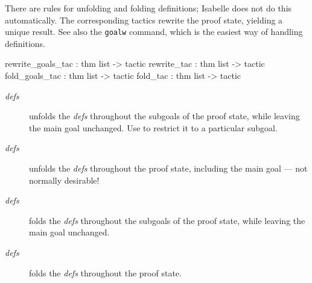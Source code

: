 There are rules for unfolding and folding definitions; Isabelle does not do
this automatically.  The corresponding tactics rewrite the proof state,
yielding a unique result.  See also the {\tt goalw} command, which is the
easiest way of handling definitions.
\begin{ttbox} 
rewrite_goals_tac : thm list -> tactic
rewrite_tac       : thm list -> tactic
fold_goals_tac    : thm list -> tactic
fold_tac          : thm list -> tactic
\end{ttbox}
\begin{description}
\item[ {\it defs}]  
unfolds the {\it defs} throughout the subgoals of the proof state, while
leaving the main goal unchanged.  Use  to restrict it to a
particular subgoal.

\item[ {\it defs}]  
unfolds the {\it defs} throughout the proof state, including the main goal
--- not normally desirable!

\item[ {\it defs}]  
folds the {\it defs} throughout the subgoals of the proof state, while
leaving the main goal unchanged.

\item[ {\it defs}]  
folds the {\it defs} throughout the proof state.
\end{description}


